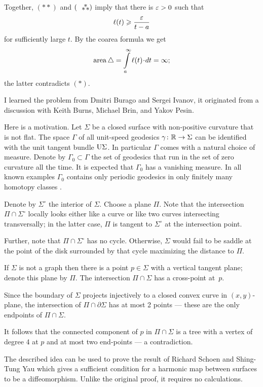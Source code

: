 Together, $({*}{*})$ and $(\asterism)$ imply that there is $\varepsilon>0$ such that
\[\ell(t)\geqslant \frac{\varepsilon}{t-a}\]
for sufficiently large $t$.
By the coarea formula we get 
\[\area\triangle=\int\limits_a^\infty\ell(t)\cdot dt=\infty;\]
the latter contradicts $(*)$.\qeds

I learned the problem from 
Dmitri Burago 
and Sergei Ivanov, 
it originated from a discussion with
Keith Burns, 
Michael Brin, 
and Yakov Pesin.

Here is a motivation.
Let $\Sigma$ be a closed surface with non-positive curvature that is not flat.
The space $\Gamma$ of all unit-speed geodesics $\gamma\:\RR\z\to\Sigma$ can be identified with the unit tangent bundle $\mathrm{U}\Sigma$. 
In particular $\Gamma$ comes with a natural choice of measure.
Denote by $\Gamma_0\subset \Gamma$ the set of geodesics that run in the set of zero curvature all the time.
It is expected that $\Gamma_0$ has a vanishing measure.
In all known examples $\Gamma_0$ contains only periodic geodesics in only finitely many homotopy classes \cite[see also][]{hertz}.

Denote by $\Sigma^\circ$ the interior of $\Sigma$.
Choose a plane $\Pi$. 
Note that the intersection $\Pi\cap \Sigma^\circ$ 
locally looks either like a curve or like two curves intersecting transversally;
in the latter case, $\Pi$ is tangent to $\Sigma^\circ$ at the intersection point.

Further, note that $\Pi\cap \Sigma^\circ$ has no cycle.
Otherwise, $\Sigma$ would fail to be saddle at the point of the disk surrounded by that cycle maximizing the distance to $\Pi$.

If $\Sigma$ is not a graph then there is a point $p\in\Sigma$ with a vertical tangent plane;
denote this plane by $\Pi$.
The intersection $\Pi\cap\Sigma$ has a cross-point at~$p$.

Since the boundary of $\Sigma$ projects injectively to a closed convex curve in $(x,y)$-plane,
the intersection of $\Pi\cap\partial \Sigma$ has at most 2 points --- these are the only endpoints of $\Pi\cap\Sigma$.

It follows that the connected component of $p$ in $\Pi\cap\Sigma$ is a tree 
with a vertex of degree 4 at $p$ and at most two end-points --- a contradiction.\qeds

The described idea can be used to prove the result of Richard Schoen and Shing-Tung  Yau \cite{schoen-yau-2D} which gives a sufficient condition for a harmonic map between surfaces to be a diffeomorphism.
Unlike the original proof, it requires no calculations.


